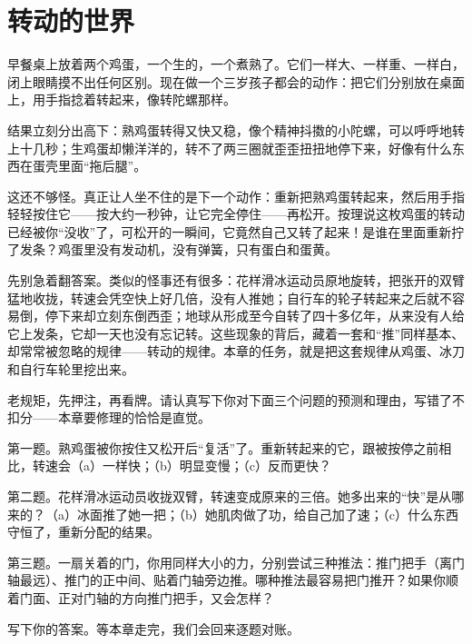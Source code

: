 \chapter{转动的世界}


\begin{mainline}
早餐桌上放着两个鸡蛋，一个生的，一个煮熟了。它们一样大、一样重、一样白，闭上眼睛摸不出任何区别。现在做一个三岁孩子都会的动作：把它们分别放在桌面上，用手指捻着转起来，像转陀螺那样。

结果立刻分出高下：熟鸡蛋转得又快又稳，像个精神抖擞的小陀螺，可以呼呼地转上十几秒；生鸡蛋却懒洋洋的，转不了两三圈就歪歪扭扭地停下来，好像有什么东西在蛋壳里面“拖后腿”。

这还不够怪。真正让人坐不住的是下一个动作：重新把熟鸡蛋转起来，然后用手指轻轻按住它——按大约一秒钟，让它完全停住——再松开。按理说这枚鸡蛋的转动已经被你“没收”了，可松开的一瞬间，它竟然自己又转了起来！是谁在里面重新拧了发条？鸡蛋里没有发动机，没有弹簧，只有蛋白和蛋黄。

先别急着翻答案。类似的怪事还有很多：花样滑冰运动员原地旋转，把张开的双臂猛地收拢，转速会凭空快上好几倍，没有人推她；自行车的轮子转起来之后就不容易倒，停下来却立刻东倒西歪；地球从形成至今自转了四十多亿年，从来没有人给它上发条，它却一天也没有忘记转。这些现象的背后，藏着一套和“推”同样基本、却常常被忽略的规律——转动的规律。本章的任务，就是把这套规律从鸡蛋、冰刀和自行车轮里挖出来。
\end{mainline}


老规矩，先押注，再看牌。请认真写下你对下面三个问题的预测和理由，写错了不扣分——本章要修理的恰恰是直觉。

第一题。熟鸡蛋被你按住又松开后“复活”了。重新转起来的它，跟被按停之前相比，转速会（a）一样快；（b）明显变慢；（c）反而更快？

第二题。花样滑冰运动员收拢双臂，转速变成原来的三倍。她多出来的“快”是从哪来的？（a）冰面推了她一把；（b）她肌肉做了功，给自己加了速；（c）什么东西守恒了，重新分配的结果。

第三题。一扇关着的门，你用同样大小的力，分别尝试三种推法：推门把手（离门轴最远）、推门的正中间、贴着门轴旁边推。哪种推法最容易把门推开？如果你顺着门面、正对门轴的方向推门把手，又会怎样？

写下你的答案。等本章走完，我们会回来逐题对账。


